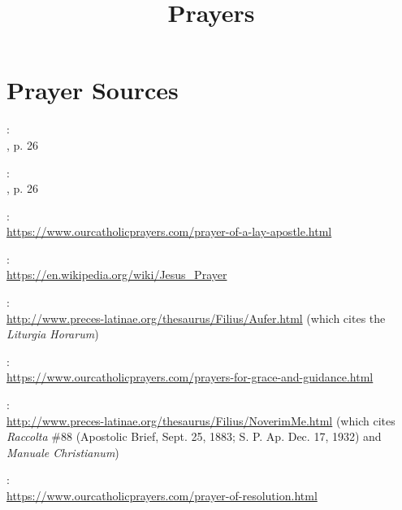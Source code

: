 \documentclass[12pt]{article}
\newcommand{\emphasis}[1]{\emph{#1}}
\newcommand{\emphasis}[1]{\textsl{#1}}
\newcommand{\foreign}[1]{\emphasis{#1}}
\begin{document}
\title{\textbf{Prayers}\date{\vspace{-10ex}}}\maketitle
\tableofcontents\newpage
























\appendix


\section{Prayer Sources}
\newcommand{\urlsource}[1]{:\\{\footnotesize\url{#1}}}

:\\
, p. 26

:\\
, p. 26

\urlsource{https://www.ourcatholicprayers.com/prayer-of-a-lay-apostle.html}

\urlsource{https://en.wikipedia.org/wiki/Jesus_Prayer}

\urlsource{http://www.preces-latinae.org/thesaurus/Filius/Aufer.html} (which cites the \foreign{Liturgia Horarum})

\urlsource{https://www.ourcatholicprayers.com/prayers-for-grace-and-guidance.html}

\urlsource{http://www.preces-latinae.org/thesaurus/Filius/NoverimMe.html} (which cites \foreign{Raccolta} \#88 (Apostolic Brief, Sept. 25, 1883; S. P. Ap. Dec. 17, 1932) and \foreign{Manuale Christianum})

\urlsource{https://www.ourcatholicprayers.com/prayer-of-resolution.html}
\end{document}
